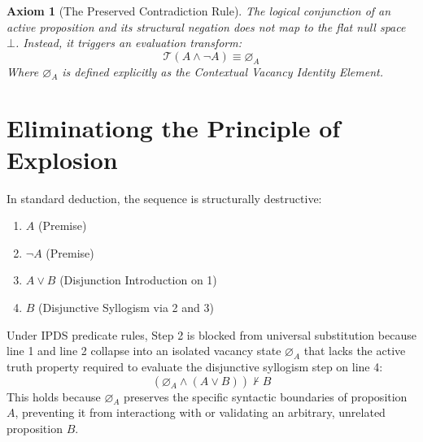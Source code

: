 \documentclass[11pt,journal,onecolumn]{IEEEtran}
\newtheorem{axiom}{Axiom}
\begin{document}
\begin{axiom}[The Preserved Contradiction Rule]
The logical conjunction of an active proposition and its structural negation does not map to the flat null space $\bot$. Instead, it triggers an evaluation transform:
\begin{equation}
\mathcal{T}(A \land \neg A) \equiv \varnothing_A
\end{equation}
Where $\varnothing_A$ is defined explicitly as the Contextual Vacancy Identity Element.
\end{axiom}

\section{Eliminationg the Principle of Explosion}
In standard deduction, the sequence is structurally destructive:
\begin{enumerate}
    \item $A$ (Premise)
    \item $\neg A$ (Premise)
    \item $A \lor B$ (Disjunction Introduction on 1)
    \item $B$ (Disjunctive Syllogism via 2 and 3)
\end{enumerate}

Under IPDS predicate rules, Step 2 is blocked from universal substitution because line 1 and line 2 collapse into an isolated vacancy state $\varnothing_A$ that lacks the active truth property required to evaluate the disjunctive syllogism step on line 4:
\begin{equation}
(\varnothing_A \land (A \lor B)) \nvdash B
\end{equation}
This holds because $\varnothing_A$ preserves the specific syntactic boundaries of proposition $A$, preventing it from interactiong with or validating an arbitrary, unrelated proposition $B$.
\end{document}
